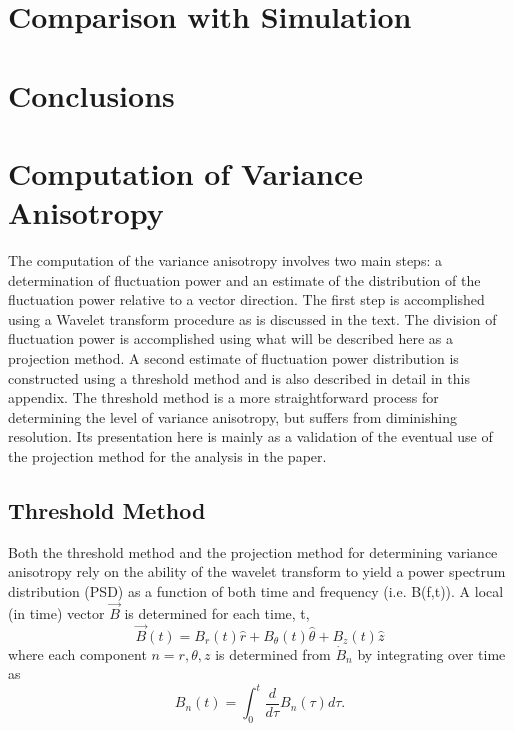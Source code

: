 \documentclass[aip,prl,amsmath,amssymb,reprint,superscriptaddress]{revtex4-1} %
\begin{document}
\section{Comparison with Simulation}

\section{Conclusions}

\appendix

\section{Computation of Variance Anisotropy}

The computation of the variance anisotropy involves two main steps: a determination of fluctuation power and an estimate of the distribution of the fluctuation power relative to a vector direction. The first step is accomplished using a Wavelet transform procedure as is discussed in the text. The division of fluctuation power is accomplished using what will be described here as a projection method. A second estimate of fluctuation power distribution is constructed using a threshold method and is also described in detail in this appendix. The threshold method is a more straightforward process for determining the level of variance anisotropy, but suffers from diminishing resolution. Its presentation here is mainly as a validation of the eventual use of the projection method for the analysis in the paper. 

\subsection{Threshold Method}

Both the threshold method and the projection method for determining variance anisotropy rely on the ability of the wavelet transform to yield a power spectrum distribution (PSD) as a function of both time and frequency (i.e. B(f,t)). A local (in time) vector $\vec{B}$ is determined for each time, t,
\begin{equation}
\vec{B}(t) = B_{r}(t)\hat{r} + B_{\theta}(t)\hat{\theta} + B_{z}(t)\hat{z}
\label{eq:Bvector}
\end{equation}
where each component $n=r,\theta,z$ is determined from $\dot{B}_{n}$ by integrating over time as
\begin{equation}
B_{n}(t) = \int_{0}^{t} \frac{d}{d\tau}B_{n}(\tau)d\tau.
\label{eq:Bintegrated}
\end{equation}
\end{document}
